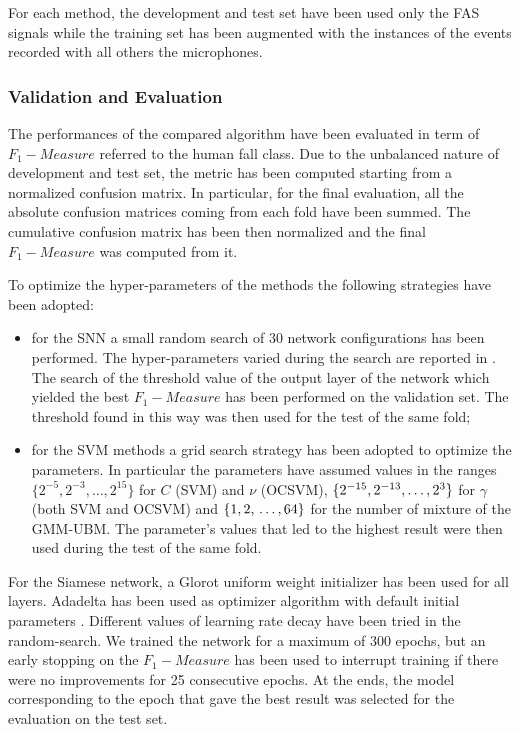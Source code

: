 For each method, the development and test set have been used only the FAS signals while the training set has been augmented with the instances of the events recorded with all others the microphones. 



\subsubsection{Validation and Evaluation}

The performances of the compared algorithm have been evaluated in term of $ F_1 -Measure$ referred to the human fall class. Due to the unbalanced nature of development and test set, the metric has been computed starting from a normalized confusion matrix. In particular, for the final evaluation, all the absolute confusion matrices coming from each fold have been summed. The cumulative confusion matrix has been then normalized and the final  $ F_1 -Measure$ was computed from it. 

To optimize the hyper-parameters of the methods the following strategies have been adopted:
\begin{itemize}
	\item for the SNN a small random search of 30 network configurations has been performed. The hyper-parameters varied during the search are reported in .
	The search of the threshold value of the output layer of the network which yielded the best $ F_1 -Measure$ has been performed on the validation set.
	The threshold found in this way was then used for the test of the same fold;
	\item for the SVM methods a grid search strategy has been adopted to optimize the parameters. In particular the parameters have assumed values in the ranges  $\{ 2^{-5},2^{-3},\ldots,2^{15} \}$ for $ C $ (SVM) and $ \nu $ (OCSVM), $\{ 2^{-15},\\2^{-13},\ldots,2^{3} \}$ for $ \gamma $ (both SVM and OCSVM) and  $\{ 1,2,\\\ldots,64 \}$ for the number of mixture of the GMM-UBM. 
	The parameter's values that led to the highest result were then used during the test of the same fold.
\end{itemize}

For the Siamese network, a Glorot uniform weight initializer has been used for all layers. Adadelta has been used as optimizer algorithm with default initial parameters \cite{zeiler2012adadelta}. Different values of learning rate decay have been tried in the random-search.
We trained the network for a maximum of 300 epochs, but an early stopping on the $ F_1 -Measure$ has been used to interrupt training if there were no improvements for 25 consecutive epochs. At the ends, the model corresponding to the epoch that gave the best result was selected for the evaluation on the test set.

